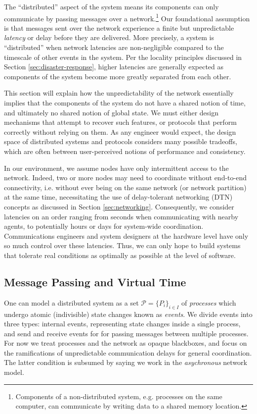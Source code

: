 \documentclass[]             %
{NASA}                       %
\theoremstyle{definition}
\newcommand{\citationneeded}{\textbf{[CITATION NEEDED]}}
\begin{document}
The ``distributed'' aspect of the system means its components can only
communicate by passing messages over a network.\footnote{Components of
  a non-distributed system, e.g. processes on the same computer, can
  communicate by writing data to a shared memory location.} Our
foundational assumption is that messages sent over the network
experience a finite but unpredictable \emph{latency} or delay before
they are delivered. More precisely, a system is ``distributed'' when
network latencies are non-negligible compared to the timescale of
other events in the system. Per the locality principles discussed in
Section \ref{sec:disaster-response}, higher latencies are generally
expected as components of the system become more greatly separated
from each other.

This section will explain how the unpredictability of the network
essentially implies that the components of the system do not have a
shared notion of time, and ultimately no shared notion of global
state. We must either design mechanisms that attempt to recover such
features, or protocols that perform correctly without relying on
them. As any engineer would expect, the design space of distributed
systems and protocols considers many possible tradeoffs, which are
often between user-perceived notions of performance and consistency.

In our environment, we assume nodes have only intermittent access to
the network. Indeed, two or more nodes may need to coordinate without
end-to-end connectivity, i.e. without ever being on the same network
(or network partition) at the same time, necessitating the use of
delay-tolerant networking (DTN) concepts as discussed in Section
\ref{sec:networking}. Consequently, we consider latencies on an order
ranging from seconds when communicating with nearby agents, to
potentially hours or days for system-wide coordination.
Communications engineers and system designers at the hardware level
have only so much control over these latencies. Thus, we can only hope
to build systems that tolerate real conditions as optimally as
possible at the level of software.

\subsection{Message Passing and Virtual Time}
\label{ssec:message-passing}
One can model a distributed system as a set
\(\mathcal{P} = \{P_i\}_{i\in I}\) of \emph{processes} which undergo
atomic (indivisible) state changes known as \emph{events}. We divide
events into three types: internal events, representing state changes
inside a single process, and send and receive events for for passing
messages between multiple processes. For now we treat processes and
the network as opaque blackboxes, and focus on the ramifications of
unpredictable communication delays for general coordination. The
latter condition is subsumed by saying we work in the
\emph{asychronous} network model.
\end{document}
